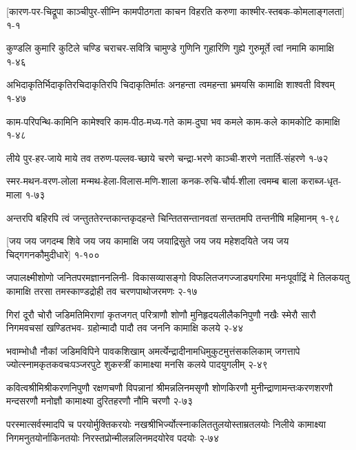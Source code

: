 \begingroup
{}
\label{sec:start}
\annotwolineshloka
{[कारण-पर-चिद्रूपा काञ्चीपुर-सीम्नि कामपीठगता}
{काचन विहरति करुणा काश्मीर-स्तबक-कोमलाङ्गलता]}
{१-१}

\annotwolineshloka
{कुण्डलि कुमारि कुटिले चण्डि चराचर-सवित्रि चामुण्डे}
{गुणिनि गुहारिणि गुह्ये गुरुमूर्ते त्वां नमामि कामाक्षि}
{१-४६}

\annotwolineshloka
{अभिदाकृतिर्भिदाकृतिरचिदाकृतिरपि चिदाकृतिर्मातः}
{अनहन्ता त्वमहन्ता भ्रमयसि कामाक्षि शाश्वती विश्वम्}
{१-४७}

\annotwolineshloka
{काम-परिपन्थि-कामिनि कामेश्वरि काम-पीठ-मध्य-गते}
{काम-दुघा भव कमले काम-कले कामकोटि कामाक्षि}
{१-४८}

\annotwolineshloka
{लीये पुर-हर-जाये माये तव तरुण-पल्लव-च्छाये}
{चरणे चन्द्रा-भरणे काञ्ची-शरणे नतार्ति-संहरणे}
{१-७२}

\annotwolineshloka
{स्मर-मथन-वरण-लोला मन्मथ-हेला-विलास-मणि-शाला}
{कनक-रुचि-चौर्य-शीला त्वमम्ब बाला कराब्ज-धृत-माला}
{१-७३}

\annotwolineshloka
{अन्तरपि बहिरपि त्वं जन्तुततेरन्तकान्तकृदहन्ते}
{चिन्तितसन्तानवतां सन्ततमपि तन्तनीषि महिमानम्}
{१-९८}

\annofourlineindentedshloka
{[जय जय जगदम्ब शिवे}
{जय जय कामाक्षि जय जयाद्रिसुते}
{जय जय महेशदयिते}
{जय जय चिद्गगनकौमुदीधारे]}
{१-१००}



\annofourlineindentedshloka
{जपालक्ष्मीशोणो जनितपरमज्ञाननलिनी-}
{विकासव्यासङ्गो विफलितजगज्जाड्यगरिमा}
{मनःपूर्वाद्रिं मे तिलकयतु कामाक्षि तरसा}
{तमस्काण्डद्रोही तव चरणपाथोजरमणः}
{२-१७}

\annofourlineindentedshloka
{गिरां दूरौ चोरौ जडिमतिमिराणां कृतजगत्}
{परित्राणौ शोणौ मुनिहृदयलीलैकनिपुणौ}
{नखैः स्मेरौ सारौ निगमवचसां खण्डितभव-}
{ग्रहोन्मादौ पादौ तव जननि कामाक्षि कलये}
{२-४४}

\annofourlineindentedshloka
{भवाम्भोधौ नौकां जडिमविपिने पावकशिखाम्}
{अमर्त्येन्द्रादीनामधिमुकुटमुत्तंसकलिकाम्}
{जगत्तापे ज्योत्स्नामकृतकवचःपञ्जरपुटे}
{शुकस्त्रीं कामाक्ष्या मनसि कलये पादयुगलीम्}
{२-४९}

\annofourlineindentedshloka
{कवित्वश्रीमिश्रीकरणनिपुणौ रक्षणचणौ}
{विपन्नानां श्रीमन्नलिनमसृणौ शोणकिरणौ}
{मुनीन्द्राणामन्तःकरणशरणौ मन्दसरणौ}
{मनोज्ञौ कामाक्ष्या दुरितहरणौ नौमि चरणौ}
{२-७३}

\annofourlineindentedshloka
{परस्मात्सर्वस्मादपि च परयोर्मुक्तिकरयोः}
{नखश्रीभिर्ज्योत्स्नाकलिततुलयोस्ताम्रतलयोः}
{निलीये कामाक्ष्या निगमनुतयोर्नाकिनतयोः}
{निरस्तप्रोन्मीलन्नलिनमदयोरेव पदयोः}
{२-७४}

